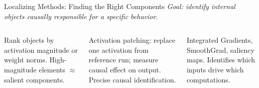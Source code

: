 \begin{frame}{Localizing Methods: Finding the Right Components}
  {\footnotesize\itshape Goal: identify internal objects causally responsible
    for a specific behavior.}
  \vspace{0.2em}

  \begin{columns}[T]
    \begin{tcolorbox}[enhanced, colback=UCRlgray, colframe=UCRmgray,
        borderline west={3pt}{0pt}{UCRnavy}, sharp corners,
        fonttitle=\bfseries\footnotesize\color{UCRnavy},
        title=Magnitude Analysis, top=3pt, bottom=3pt]
      \scriptsize Rank objects by activation magnitude or weight norms.
      High-magnitude elements $\approx$ salient components.
    \end{tcolorbox}\vspace{3pt}
    \begin{tcolorbox}[enhanced, colback=UCRlgray, colframe=UCRmgray,
        borderline west={3pt}{0pt}{UCRnavy}, sharp corners,
        fonttitle=\bfseries\footnotesize\color{UCRnavy},
        title=Causal Attribution, top=3pt, bottom=3pt]
      \scriptsize Activation patching: replace one activation from reference run;
      measure causal effect on output. Precise causal identification.
    \end{tcolorbox}\vspace{3pt}
    \begin{tcolorbox}[enhanced, colback=UCRlgray, colframe=UCRmgray,
        borderline west={3pt}{0pt}{UCRnavy}, sharp corners,
        fonttitle=\bfseries\footnotesize\color{UCRnavy},
        title=Gradient Detection, top=3pt, bottom=3pt]
      \scriptsize Integrated Gradients, SmoothGrad, saliency maps.
      Identifies which inputs drive which computations.
    \end{tcolorbox}


\end{columns}
\end{frame}
